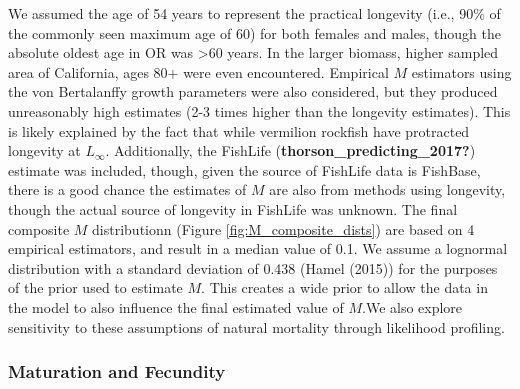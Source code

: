 \documentclass[11pt,
  english,
  a4paper,
]{article}
\begin{document}
\leavevmode\tagmcend\tagstructend\par


We assumed the age of 54 years to represent the practical longevity (i.e., 90\% of the commonly seen maximum age of 60) for both females and males, though the absolute oldest age in OR was \textgreater60 years. In the larger biomass, higher sampled area of California, ages 80+ were even encountered. Empirical {\(M\)\leavevmode\tagmcend\tagstructend} estimators using the von Bertalanffy growth parameters were also considered, but they produced unreasonably high estimates (2-3 times higher than the longevity estimates). This is likely explained by the fact that while vermilion rockfish have protracted longevity at {\(L_{\infty}\)\leavevmode\tagmcend\tagstructend}. Additionally, the FishLife {(\textbf{thorson\_predicting\_2017?})\leavevmode\tagmcend\tagstructend} estimate was included, though, given the source of FishLife data is FishBase, there is a good chance the estimates of {\(M\)\leavevmode\tagmcend\tagstructend} are also from methods using longevity, though the actual source of longevity in FishLife was unknown. The final composite {\(M\)\leavevmode\tagmcend\tagstructend} distributionn (Figure \ref{fig:M_composite_dists}) are based on 4 empirical estimators, and result in a median value of 0.1. We assume a lognormal distribution with a standard deviation of 0.438 ({Hamel (2015)\leavevmode\tagmcend\tagstructend}) for the purposes of the prior used to estimate {\(M\)\leavevmode\tagmcend\tagstructend}. This creates a wide prior to allow the data in the model to also influence the final estimated value of {\(M\)\leavevmode\tagmcend\tagstructend}.We also explore sensitivity to these assumptions of natural mortality through likelihood profiling.

\leavevmode\tagmcend\tagstructend\par


\hypertarget{maturation-and-fecundity}{%
\subsubsection{Maturation and Fecundity}\label{maturation-and-fecundity}}
\end{document}
